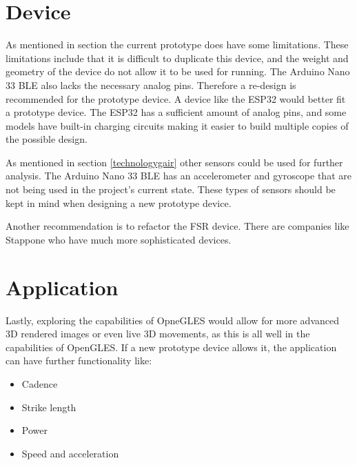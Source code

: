 \section{Device}

As mentioned in section\label{li} the current prototype does have some limitations. These limitations include that it is difficult to duplicate this device, and the weight and geometry of the device do not allow it to be used for running. The Arduino Nano 33 BLE also lacks the necessary analog pins. Therefore a re-design is recommended for the prototype device. A device like the ESP32 would better fit a prototype device. The ESP32 has a sufficient amount of analog pins, and some models have built-in charging circuits making it easier to build multiple copies of the possible design.

As mentioned in section \ref{technologygair} other sensors could be used for further analysis. The Arduino Nano 33 BLE has an accelerometer and gyroscope that are not being used in the project's current state. These types of sensors should be kept in mind when designing a new prototype device.

Another recommendation is to refactor the FSR device. There are companies like Stappone\cite{stappone}  who have much more sophisticated devices.
\section{Application}

Lastly,  exploring the capabilities of OpneGLES would allow for more advanced 3D rendered images or even live 3D movements, as this is all well in the capabilities of OpenGLES.
If a new prototype device allows it, the application can have further functionality like:
\begin{itemize}
    \item Cadence
    \item Strike length
    \item Power
    \item Speed and acceleration 
  \end{itemize}
